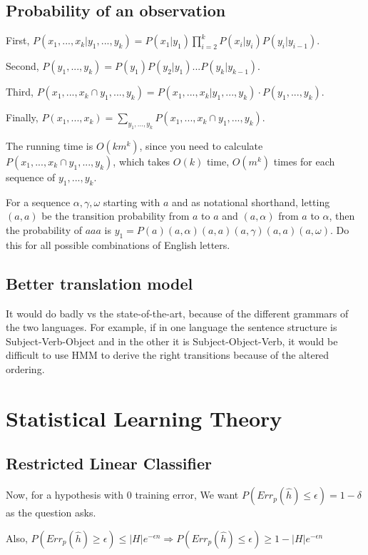 \documentclass[]{article}
\begin{document}
\subsection{Probability of an observation}

First, $P(x_1,...,x_k|y_1,...,y_k) = P(x_1|y_1) \prod_{i=2}^k P(x_i|y_i)P(y_i|y_{i-1})$.

Second, $P(y_1,...,y_k) = P(y_1)P(y_2|y_1)...P(y_k|y_{k-1})$.

Third, $P(x_1,...,x_k \cap y_1,...,y_k) = P(x_1,...,x_k|y_1,...,y_k) \cdot P(y_1,...,y_k)$.

Finally, $P(x_1,...,x_k) = \sum_{y_1,...,y_k} P(x_1,...,x_k \cap y_1,...,y_k)$.

The running time is $O(km^k)$, since you need to calculate $P(x_1,...,x_k \cap y_1,...,y_k)$, which takes $O(k)$ time, $O(m^k)$ times for each sequence of $y_1,...,y_k$.

For a sequence $\alpha, \gamma, \omega$ starting with $a$ and as notational shorthand, letting $(a,a)$ be the transition probability from $a$ to $a$ and $(a,\alpha)$ from $a$ to $\alpha$, then the probability of $aaa$ is $y_1 = P(a)(a,\alpha)(a,a)(a,\gamma)(a,a)(a,\omega)$. Do this for all possible combinations of English letters.

\subsection{Better translation model}

It would do badly vs the state-of-the-art, because of the different grammars of the two languages. For example, if in one language the sentence structure is Subject-Verb-Object and in the other it is Subject-Object-Verb, it would be difficult to use HMM to derive the right transitions because of the altered ordering.

\section{Statistical Learning Theory}

\subsection{Restricted Linear Classifier}

Now, for a hypothesis with 0 training error, We want $P(Err_p(\hat h) \le \epsilon) = 1- \delta$ as the question asks.

Also, $P(Err_p(\hat h) \ge \epsilon) \le |H|e^{-\epsilon n} \Rightarrow P(Err_p(\hat h) \le \epsilon) \ge 1 - |H|e^{-\epsilon n}$
\end{document}
